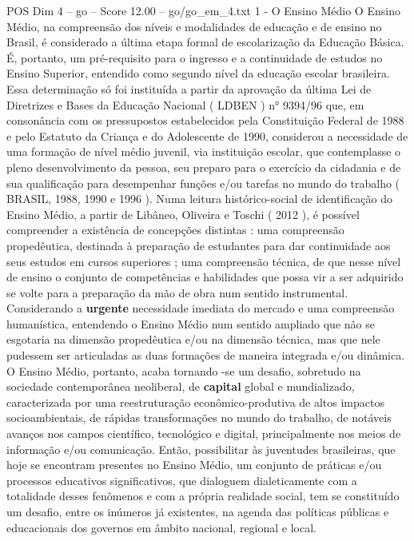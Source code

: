 \begin{textsample}{POS Dim 4 – go – Score 12.00 – go/go\_em\_4.txt}  \label{ex:f4_pos_069}
1 - O Ensino Médio O Ensino Médio, na compreensão dos níveis e modalidades de educação e de ensino no Brasil, é considerado a última etapa formal de escolarização da Educação Básica.
É, portanto, um pré-requisito para o ingresso e a continuidade de estudos no Ensino Superior, entendido como segundo nível da educação escolar brasileira.
Essa determinação só foi instituída a partir da aprovação da última Lei de Diretrizes e Bases da Educação Nacional ( LDBEN ) n{\EmojiFont °} 9394/96 que, em consonância com os pressupostos estabelecidos pela Constituição Federal de 1988 e pelo Estatuto da Criança e do Adolescente de 1990, considerou a necessidade de uma formação de nível médio juvenil, via instituição escolar, que contemplasse o pleno desenvolvimento da pessoa, seu preparo para o exercício da cidadania e de sua qualificação para desempenhar funções e/ou tarefas no mundo do trabalho ( BRASIL, 1988, 1990 e 1996 ).
Numa leitura histórico-social de identificação do Ensino Médio, a partir de Libâneo, Oliveira e Toschi ( 2012 ), é possível compreender a existência de concepções distintas : uma compreensão propedêutica, destinada à preparação de estudantes para dar continuidade aos seus estudos em cursos superiores ; uma compreensão técnica, de que nesse nível de ensino o conjunto de competências e habilidades que possa vir a ser adquirido se volte para a preparação da mão de obra num sentido instrumental.
Considerando a \textbf{urgente} necessidade imediata do mercado e uma compreensão humanística, entendendo o Ensino Médio num sentido ampliado que não se esgotaria na dimensão propedêutica e/ou na dimensão técnica, mas que nele pudessem ser articuladas as duas formações de maneira integrada e/ou dinâmica.
O Ensino Médio, portanto, acaba tornando -se um desafio, sobretudo na sociedade contemporânea neoliberal, de \textbf{capital} global e mundializado, caracterizada por uma reestruturação econômico-produtiva de altos impactos socioambientais, de rápidas transformações no mundo do trabalho, de notáveis avanços nos campos científico, tecnológico e digital, principalmente nos meios de informação e/ou comunicação.
Então, possibilitar às juventudes brasileiras, que hoje se encontram presentes no Ensino Médio, um conjunto de práticas e/ou processos educativos significativos, que dialoguem dialeticamente com a totalidade desses fenômenos e com a própria realidade social, tem se constituído um desafio, entre os inúmeros já existentes, na agenda das políticas públicas e educacionais dos governos em âmbito nacional, regional e local.

\end{textsample}
